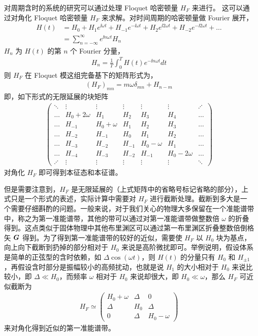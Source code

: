 对周期含时的系统的研究可以通过处理 Floquet 哈密顿量 $H_F$ 来进行。
这可以通过对角化 Floquet 哈密顿量 $H_F$ 来求解。对时间周期的哈密顿量做 Fourier 展开，
\begin{align}
H(t) &= H_0 + H_1e^{\ii\omega t} + H_{-1}e^{-\ii\omega t} 
+ H_2e^{\ii2\omega t} + H_{-2}e^{-\ii2\omega t} + \ldots\\
&= \sum_{n=-\infty}^{\infty} e^{\ii n\omega t}H_n
\end{align}
$H_n$ 为 $H(t)$ 的第 $n$ 个 Fourier 分量，
\begin{align}
H_n = \frac{1}{T}\int_0^TH(t)e^{-\ii n\omega t}dt
\end{align}
则 $H_F$ 在 Floquet 模这组完备基下的矩阵形式为，
\begin{align}
(H_F)_{mn} = m\omega\delta_{mn} + H_{n-m}
\end{align}
即，如下形式的无限延展的块矩阵
\begin{align}
\begin{pmatrix}
 \ddots & \vdots & \vdots & \vdots & \vdots & \vdots &  \iddots \\
 \ldots & H_0 + 2\omega & H_1 & H_2 & H_3 & H_4 & \ldots \\
 \ldots & H_{-1} & H_0 + \omega & H_1 & H_2 & H_3 & \ldots \\
 \ldots & H_{-2} & H_{-1} & H_0 & H_1 & H_2 & \ldots \\
 \ldots & H_{-3} & H_{-2} & H_{-1} & H_0 - \omega & H_1 & \ldots \\
 \ldots & H_{-4} & H_{-3} & H_{-2} & H_{-1} & H_0 - 2\omega & \ldots \\
\iddots & \vdots & \vdots & \vdots & \vdots & \vdots &  \ddots 
\end{pmatrix}
\end{align}
对角化 $H_F$ 即可得到本征态和本征谱。

但是需要注意到，$H_F$ 是无限延展的（上式矩阵中的省略号标记省略的部分），上式只是一个形式的表述，实际计算中需要对 $H_F$ 进行截断处理。截断到多大是一个需要仔细斟酌的问题。一般来说，对于我们关心的物理大多保留在一个准能谱带中，称之为第一准能谱带，其他的带可以通过对第一准能谱带做整数倍 $\omega$ 的折叠得到。这点类似于固体物理中其他布里渊区可以通过第一布里渊区折叠整数倍倒格矢 $\boldsymbol{G}$ 得到。为了得到第一准能谱带的较好的近似，需要使 $H_F$ 以 $H_0$ 块为基点，向上向下截断到扔掉的部分相对于 $H_0$ 来说是高阶微扰即可。举例说明，假设体系是简单的正弦型的含时依赖，如 $\Delta\cos(\omega t)$，则 $H(t)$ 的分量只有 $H_0$ 和 $H_{\pm1}$，再假设含时部分是振幅较小的高频扰动，也就是说 $H_1$ 的大小相对于 $H_0$ 来说比较小，即 $\Delta\ll H_0$，而频率 $\omega$ 相对于 $H_0$ 来说却很大，即 $H_0\ll\omega$，那么 $H_F$ 可近似截断为
\begin{align}
H_F \simeq \begin{pmatrix}
H_0 + \omega & \Delta & 0 \\
\Delta & H_0 & \Delta \\
0 & \Delta & H_0 - \omega 
\end{pmatrix}
\end{align}
来对角化得到近似的第一准能谱带。

